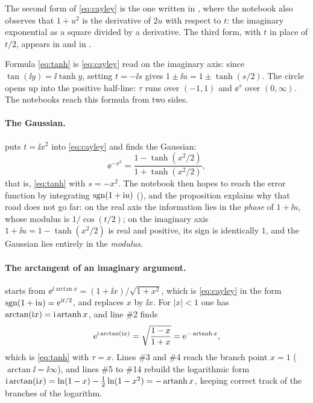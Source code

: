 The second form of \eqref{eq:cayley} is the one written in
, where the notebook also observes that $1+u^2$ is the
derivative of $2u$ with respect to $t$: the imaginary exponential as a square
divided by a derivative. The third form, with $t$ in place of $t/2$, appears
in  and in .

Formula \eqref{eq:tanh} is \eqref{eq:cayley} read on the imaginary axis:
since $\tan(\ii y)=\ii\tanh y$, setting $t=-\ii s$ gives
$1\pm\ii u=1\pm\tanh(s/2)$. The circle opens up into the positive half-line:
$\tau$ runs over $(-1,1)$ and $\ee^{s}$ over $(0,\infty)$. The notebooks reach
this formula from two sides.

\paragraph{The Gaussian.}
 puts $t=\ii x^2$ into \eqref{eq:cayley} and finds the
Gaussian:
\[
  \ee^{-x^2}=\frac{1-\tanh(x^2/2)}{1+\tanh(x^2/2)} ,
\]
that is, \eqref{eq:tanh} with $s=-x^2$. The notebook then hopes to reach the
error function by integrating $\operatorname{sgn}(1+\mathrm{i} u)$ (),
and the proposition explains why that road does not go far: on the real axis
the information lies in the \emph{phase} of $1+\ii u$, whose modulus is
$1/\cos(t/2)$; on the imaginary axis $1+\ii u=1-\tanh(x^2/2)$ is real and
positive, its sign is identically $1$, and the Gaussian lies entirely in the
\emph{modulus}.

\paragraph{The arctangent of an imaginary argument.}
 starts from
$\ee^{\ii\arctan x}=(1+\ii x)/\sqrt{1+x^2}$, which is \eqref{eq:cayley} in the
form $\operatorname{sgn}(1+\mathrm{i} u)=\mathrm{e}^{\mathrm{i} t/2}$, and replaces $x$ by $\ii x$. For $|x|<1$
one has $\arctan(\mathrm{i} x)=\mathrm{i}\operatorname{artanh} x$, and line \#2 finds
\[
  \mathrm{e}^{\mathrm{i}\arctan(\mathrm{i} x)}=\sqrt{\frac{1-x}{1+x}}=\mathrm{e}^{-\operatorname{artanh} x},
\]
which is \eqref{eq:tanh} with $\tau=x$. Lines \#3 and \#4 reach the branch
point $x=1$ ($\arctan\ii=\ii\infty$), and lines \#5 to \#14 rebuild the
logarithmic form $\mathrm{i}\arctan(\mathrm{i} x)=\ln(1-x)-\tfrac12\ln(1-x^2)=-\operatorname{artanh} x$,
keeping correct track of the branches of the logarithm.


